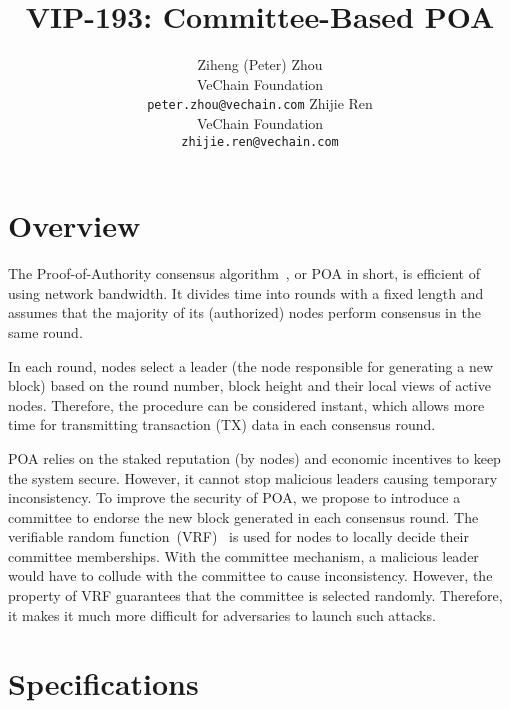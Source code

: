\documentclass{article}
\title{VIP-193: Committee-Based POA}
\author{
  Ziheng (Peter) Zhou \vspace{1ex}\\
  VeChain Foundation \\
  \texttt{peter.zhou@vechain.com}
  \And
  Zhijie Ren \vspace{1ex} \\
  VeChain Foundation \\
  \texttt{zhijie.ren@vechain.com}
}
\date{}
\begin{document}
\maketitle




\section{Overview}
The Proof-of-Authority consensus algorithm~\cite{VWP18}, or POA in short, is efficient of using network bandwidth. It divides time into rounds with a fixed length and assumes that the majority of its (authorized) nodes perform consensus in the same round. 

In each round, nodes select a leader (the node responsible for generating a new block) based on the round number, block height and their local views of active nodes. Therefore, the procedure can be considered instant, which allows more time for transmitting transaction (TX) data in each consensus round.

POA relies on the staked reputation (by nodes) and economic incentives to keep the system secure. However, it cannot stop malicious leaders causing temporary inconsistency. To improve the security of POA, we propose to introduce a committee to endorse the new block generated in each consensus round. The verifiable random function~(VRF)~\cite{PapEtAl99} is used for nodes to locally decide their committee memberships. With the committee mechanism, a malicious leader would have to collude with the committee to cause inconsistency. However, the property of VRF guarantees that the committee is selected randomly. Therefore, it makes it much more difficult for adversaries to launch such attacks.  

\section{Specifications}
\end{document}
